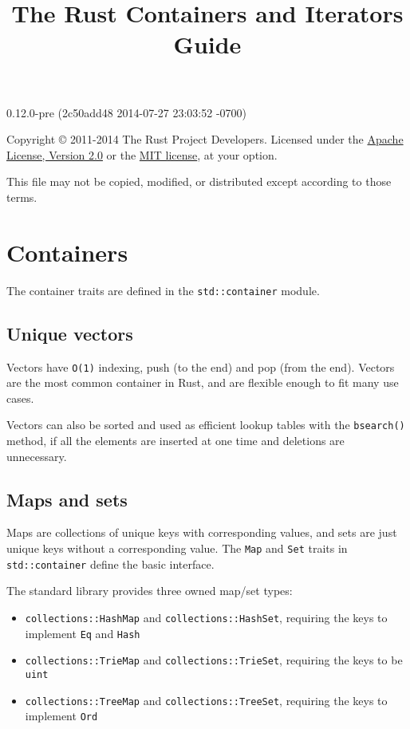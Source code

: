 \documentclass[]{article}
\title{The Rust Containers and Iterators Guide}
\begin{document}
\maketitle

0.12.0-pre (2c50add48 2014-07-27 23:03:52 -0700)

Copyright © 2011-2014 The Rust Project Developers. Licensed under the
\href{http://www.apache.org/licenses/LICENSE-2.0}{Apache License,
Version 2.0} or the \href{http://opensource.org/licenses/MIT}{MIT
license}, at your option.

This file may not be copied, modified, or distributed except according
to those terms.

{
\hypersetup{linkcolor=black}
\setcounter{tocdepth}{3}
\tableofcontents
}
\section{Containers}\label{containers}

The container traits are defined in the \texttt{std::container} module.

\subsection{Unique vectors}\label{unique-vectors}

Vectors have \texttt{O(1)} indexing, push (to the end) and pop (from the
end). Vectors are the most common container in Rust, and are flexible
enough to fit many use cases.

Vectors can also be sorted and used as efficient lookup tables with the
\texttt{bsearch()} method, if all the elements are inserted at one time
and deletions are unnecessary.

\subsection{Maps and sets}\label{maps-and-sets}

Maps are collections of unique keys with corresponding values, and sets
are just unique keys without a corresponding value. The \texttt{Map} and
\texttt{Set} traits in \texttt{std::container} define the basic
interface.

The standard library provides three owned map/set types:

\begin{itemize}
\itemsep1pt\parskip0pt
\item
  \texttt{collections::HashMap} and \texttt{collections::HashSet},
  requiring the keys to implement \texttt{Eq} and \texttt{Hash}
\item
  \texttt{collections::TrieMap} and \texttt{collections::TrieSet},
  requiring the keys to be \texttt{uint}
\item
  \texttt{collections::TreeMap} and \texttt{collections::TreeSet},
  requiring the keys to implement \texttt{Ord}
\end{itemize}
\end{document}
